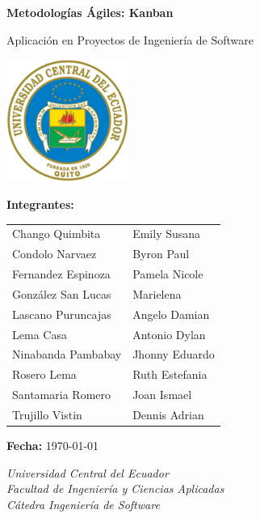 \begin{titlepage}
    \centering
    \vspace*{1.5cm}
    
    {\LARGE\bfseries Metodologías Ágiles: Kanban \par}
    \vspace{0.5cm}
    {\large Aplicación en Proyectos de Ingeniería de Software \par}
    
    \vspace{0.8cm}
    \includegraphics[width=0.3\textwidth]{assets/icons/logo-UCE.png}
    \vspace{0.5cm}
    
    \vfill
    
    {\normalsize \textbf{Integrantes:} \par}
    \vspace{0.3cm}
    \begin{minipage}{0.7\textwidth}
    \centering
    \begin{tabular}{ll}
        Chango Quimbita & Emily Susana \\
        Condolo Narvaez & Byron Paul \\
        Fernandez Espinoza & Pamela Nicole \\
        González San Lucas & Marielena \\
        Lascano Puruncajas & Angelo Damian \\
        Lema Casa & Antonio Dylan \\
        Ninabanda Pambabay & Jhonny Eduardo \\
        Rosero Lema & Ruth Estefania \\
        Santamaria Romero & Joan Ismael \\
        Trujillo Vistin & Dennis Adrian \\
    \end{tabular}
    \end{minipage}
    
    \vspace{1cm}
    {\normalsize \textbf{Fecha:} \today \par}
    \vspace{1cm}
    
    \vfill
    
    {\small\textit{Universidad Central del Ecuador \\ Facultad de Ingeniería y Ciencias Aplicadas \\ Cátedra Ingeniería de Software}}
\end{titlepage}

